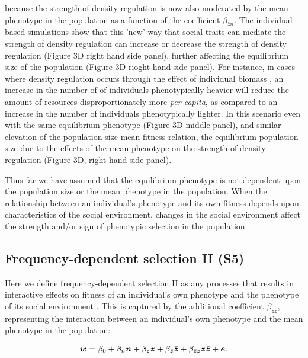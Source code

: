 \documentclass{article}
\begin{document}
\noindent because the strength of density regulation is now also moderated by the mean phenotype in the population as a function of the coefficient  $\beta_{\bar{z}n}$. The individual-based simulations show that this 'new' way that social traits can mediate the strength of density regulation can increase or decrease the strength of density regulation (Figure 3D right hand side panel), further affecting the equilibrium size of the population (Figure 3D rioght hand side panel). For instance, in cases where density regulation occurs through the effect of individual biomass \citep{Owen-Smith2002}, an increase in the number of of individuals phenotypically heavier will reduce the amount of resources disproportionately more \textit{per capita}, as compared to an increase in the number of individuals phenotypically lighter. In this scenario even with the same equilibrium phenotype (Figure 3D middle panel), and similar elevation of the population size-mean fitness relation, the equilibrium population size due to the effects of the mean phenotype on the strength of density regulation (Figure 3D, right-hand side panel). 

Thus far we have assumed that the equilibrium phenotype is not dependent upon the population size or the mean phenotype in the population. When the relationship between an individual's phenotype and its own fitness depends upon characteristics of the social environment, changes in the social environment affect the strength and/or sign of phenotypic selection in the population. 
 
 
\subsection{Frequency-dependent selection II (S5)}

 Here we define frequency-dependent selection II as any processes that results in interactive effects on fitness of an individual's own phenotype and the phenotype of its social environment \citep{Araya-Ajoy2020}. This is captured by the additional coefficient $\beta_{\bar{z}z}$, representing the interaction between an individual's own phenotype and the mean phenotype in the population:  

\begin{equation} \label{eq: FDS}
\vectorsym{w}=\beta_{0} +\beta_{n} \vectorsym{n} + \beta_{z} \vectorsym{z}+ \beta_{\bar{z}} \vectorsym{\bar{z}}  + \beta_{\bar{z}z} \vectorsym{z\bar{z}}  +  \vectorsym{e}.
\end{equation}
\end{document}
